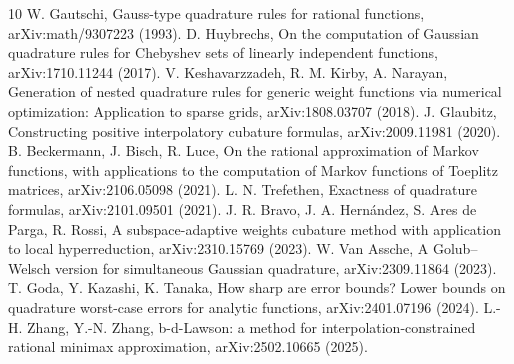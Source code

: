 \documentclass[preprint,12pt]{elsarticle}
\theoremstyle{remark}
\begin{document}
\begin{thebibliography}{10}
\providecommand{\url}[1]{\texttt{#1}}
 W. Gautschi, Gauss-type quadrature rules for
rational functions, arXiv:math/9307223 (1993).
 D. Huybrechs, On the computation of Gaussian
quadrature rules for Chebyshev sets of linearly independent functions,
arXiv:1710.11244 (2017).
 V. Keshavarzzadeh, R. M. Kirby,
A. Narayan, Generation of nested quadrature rules for generic weight
functions via numerical optimization: Application to sparse grids,
arXiv:1808.03707 (2018).
 J. Glaubitz, Constructing positive interpolatory
cubature formulas, arXiv:2009.11981 (2020).
 B. Beckermann, J. Bisch, R. Luce, On the
rational approximation of Markov functions, with applications to the
computation of Markov functions of Toeplitz matrices, arXiv:2106.05098
(2021).
 L. N. Trefethen, Exactness of quadrature
formulas, arXiv:2101.09501 (2021).
 J. R. Bravo, J. A. Hern\'andez, S. Ares de Parga,
R. Rossi, A subspace-adaptive weights cubature method with application
to local hyperreduction, arXiv:2310.15769 (2023).
 W. Van Assche, A Golub--Welsch version for
simultaneous Gaussian quadrature, arXiv:2309.11864 (2023).
 T. Goda, Y. Kazashi, K. Tanaka, How sharp are error
bounds? Lower bounds on quadrature worst-case errors for analytic
functions, arXiv:2401.07196 (2024).
 L.-H. Zhang, Y.-N. Zhang, b-d-Lawson: a method for
interpolation-constrained rational minimax approximation,
arXiv:2502.10665 (2025).
\end{thebibliography}
\end{document}
